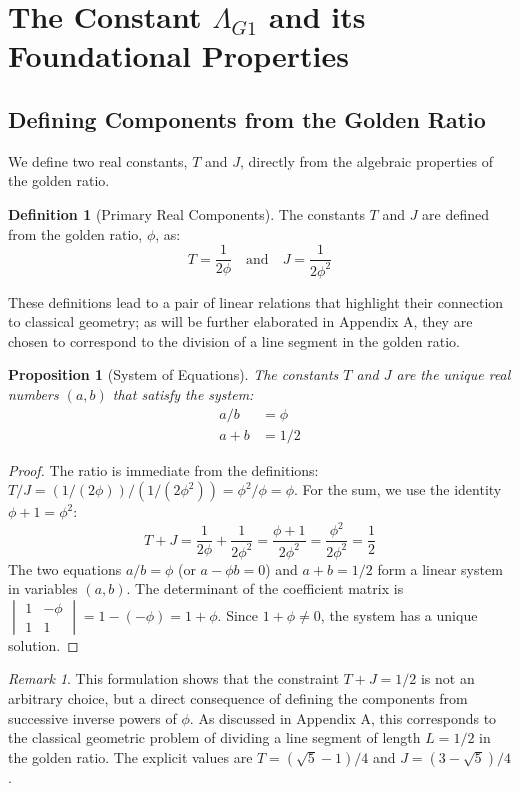 \documentclass{amsart}
\theoremstyle{plain}
\newtheorem{proposition}[theorem]{Proposition}
\theoremstyle{definition}
\newtheorem{definition}[theorem]{Definition}
\theoremstyle{remark}
\newtheorem*{remark}{Remark}
\newcommand{\LambdaG}{\Lambda_{G1}}
\newcommand{\phiG}{\phi}
\begin{document}
\section{The Constant \texorpdfstring{$\LambdaG$}{Lambda\_G1} and its Foundational Properties}

\subsection{Defining Components from the Golden Ratio}
We define two real constants, $T$ and $J$, directly from the algebraic properties of the golden ratio.
\begin{definition}[Primary Real Components]
The constants $T$ and $J$ are defined from the golden ratio, $\phiG$, as:
\[ T = \frac{1}{2\phiG} \quad \text{and} \quad J = \frac{1}{2\phiG^2} \]
\end{definition}

These definitions lead to a pair of linear relations that highlight their connection to classical geometry; as will be further elaborated in Appendix A, they are chosen to correspond to the division of a line segment in the golden ratio.
\begin{proposition}[System of Equations]
The constants $T$ and $J$ are the unique real numbers $(a,b)$ that satisfy the system:
\begin{align}
    a/b &= \phiG \label{eq:1} \\
    a+b &= 1/2 \label{eq:2}
\end{align}
\end{proposition}
\begin{proof}
The ratio is immediate from the definitions: $T/J = (1/(2\phiG))/(1/(2\phiG^2)) = \phiG^2/\phiG = \phiG$. For the sum, we use the identity $\phiG+1 = \phiG^2$:
\[ T+J = \frac{1}{2\phiG} + \frac{1}{2\phiG^2} = \frac{\phiG+1}{2\phiG^2} = \frac{\phiG^2}{2\phiG^2} = \frac{1}{2} \]
The two equations $a/b = \phiG$ (or $a - \phiG b = 0$) and $a+b=1/2$ form a linear system in variables $(a,b)$. The determinant of the coefficient matrix is $\begin{vmatrix} 1 & -\phiG \\ 1 & 1 \end{vmatrix} = 1 - (-\phiG) = 1+\phiG$. Since $1+\phiG \neq 0$, the system has a unique solution.
\end{proof}

\begin{remark}
This formulation shows that the constraint $T+J=1/2$ is not an arbitrary choice, but a direct consequence of defining the components from successive inverse powers of $\phiG$. As discussed in Appendix A, this corresponds to the classical geometric problem of dividing a line segment of length $L=1/2$ in the golden ratio. The explicit values are $T = (\sqrt{5}-1)/4$ and $J = (3-\sqrt{5})/4$.
\end{remark}
\end{document}
